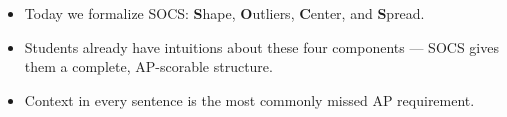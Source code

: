 \documentclass[10pt]{article}
\begin{document}
\vspace{0.14in}

\begin{tcolorbox}[colback=greenbg, colframe=greenacc, boxrule=0.8pt, arc=2mm,
    left=4mm, right=4mm, top=3mm, bottom=3mm]
\small
\begin{itemize}[leftmargin=1.3em, itemsep=5pt]
  \item Today we formalize SOCS: \textbf{S}hape, \textbf{O}utliers,
        \textbf{C}enter, and \textbf{S}pread.
  \item Students already have intuitions about these four components ---
        SOCS gives them a complete, AP-scorable structure.
  \item Context in every sentence is the most commonly missed AP requirement.
\end{itemize}
\end{tcolorbox}
\end{document}
